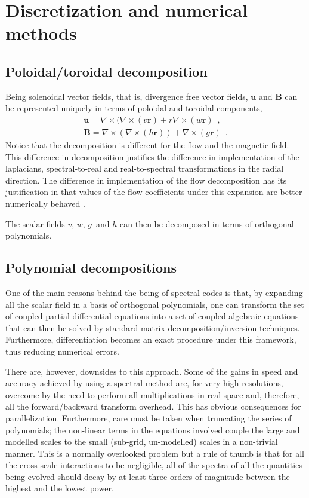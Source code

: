 \documentclass[a4paper,10pt]{book}
\renewcommand{\vec}[1]{\mathbf{#1}}
\begin{document}
\chapter{Discretization and numerical methods}

\section{Poloidal/toroidal decomposition}
Being solenoidal vector fields, that is, divergence free vector fields, $\vec u$
and $\vec B$ can be represented uniquely in terms of poloidal and toroidal
components,
\begin{subequations}
\begin{gather}
\vec u = \nabla \times ( \nabla \times (v \vec r) +
         r \nabla \times ( w \vec r) \enspace , \\
\vec B = \nabla \times ( \nabla \times (h \vec r) ) +
         \nabla \times ( g \vec r) \enspace .
\end{gather}
\end{subequations}
Notice that the decomposition is different for the flow and the magnetic field.
This difference in decomposition justifies the difference in implementation of
the laplacians, spectral-to-real and real-to-spectral transformations in the
radial direction. The difference in implementation of the flow decomposition has
its justification in that values of the flow coefficients under this expansion
are better numerically behaved \citep{Tilgner1999}.

The scalar fields $v$, $w$, $g$\ and $h$ can then be decomposed in terms of
orthogonal polynomials.

\section{Polynomial decompositions}
One of the main reasons behind the being of spectral codes is that, by expanding
all the scalar field in a basis of orthogonal polynomials, one can transform the
set of coupled partial differential equations into a set of coupled algebraic
equations that can then be solved by standard matrix decomposition/inversion
techniques. Furthermore, differentiation becomes an exact procedure under this
framework, thus reducing numerical errors.

There are, however, downsides to this approach. Some of the gains in speed and
accuracy achieved by using a spectral method are, for very high resolutions,
overcome by the need to perform all multiplications in real space and,
therefore, all the forward/backward transform overhead. This has obvious
consequences for parallelization. Furthermore, care must be taken when
truncating the series of polynomials; the non-linear terms in the equations
involved couple the large and modelled scales to the small (sub-grid,
un-modelled) scales in a non-trivial manner. This is a normally overlooked
problem but a rule of thumb is that for all the cross-scale interactions to be
negligible, all of the spectra of all the quantities being evolved should decay
by at least three orders of magnitude between the highest and the lowest power.
\end{document}
